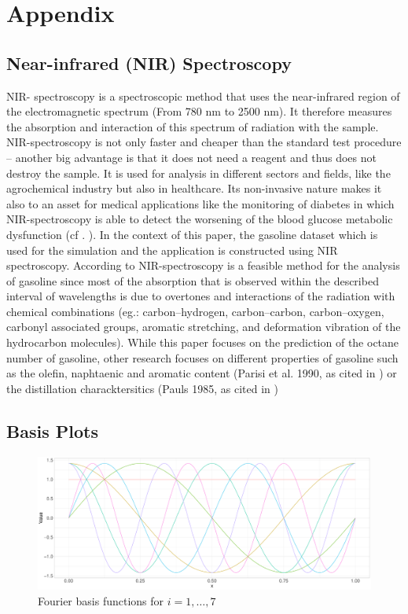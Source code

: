 \documentclass[11pt,twoside,a4paper]{article}
\begin{document}
	\newpage
	\section{Appendix}
	
	\subsection{Near-infrared (NIR) Spectroscopy}
	NIR- spectroscopy is a spectroscopic method that uses the near-infrared region of the electromagnetic spectrum (From 780 nm to 2500 nm). It therefore measures the absorption and interaction of this spectrum of radiation with the sample. NIR-spectroscopy is not only faster and cheaper than the standard test procedure – another big advantage is that it does not need a reagent and thus does not destroy the sample. It is used for analysis in different sectors and fields, like the agrochemical industry but also in healthcare. Its non-invasive nature makes it also to an asset for medical applications like the monitoring of diabetes in which NIR-spectroscopy is able to detect the worsening of the blood glucose metabolic dysfunction (cf . \cite{FR_li_et_al_2020}). In the context of this paper, the gasoline dataset which is used for the simulation and the application is constructed using NIR spectroscopy. According to \cite{Bohacs_Ovadi_Salgo1998} NIR-spectroscopy is a feasible method for the analysis of gasoline since most of the absorption that is observed within the described interval of wavelengths is due to overtones and interactions of the radiation with chemical combinations (eg.: carbon–hydrogen, carbon–carbon, carbon–oxygen, carbonyl associated groups, aromatic stretching, and deformation vibration of the hydrocarbon molecules). While this paper focuses on the prediction of the octane number of gasoline, other research focuses  on different properties of gasoline such as the olefin, naphtaenic and aromatic content (Parisi et al. 1990, as cited in \cite{Bohacs_Ovadi_Salgo1998}) or the distillation characktersitics (Pauls 1985, as cited in \cite{Bohacs_Ovadi_Salgo1998})

	
	\subsection{Basis Plots}
	
	\begin{figure}[H]\label{fourier_basis}
		\includegraphics[width = \textwidth]{../Graphics/Fourier_Basis.pdf}
		\caption{Fourier basis functions for $i = 1,\dots,7$}
	\end{figure}
	
\end{document}
